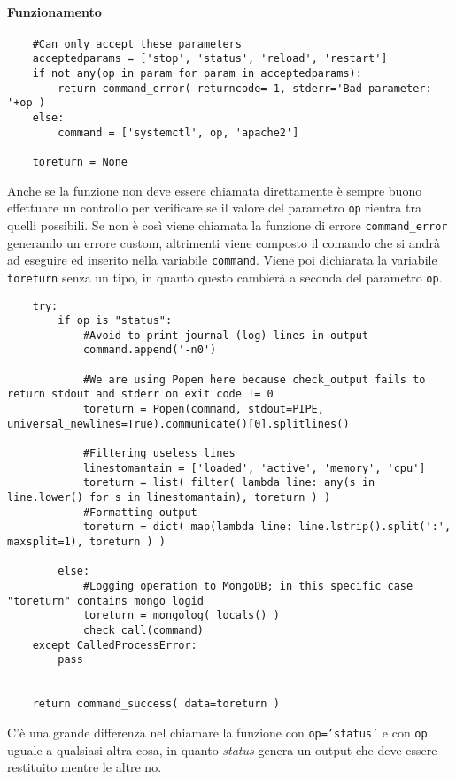 \documentclass[11pt]{article}
\begin{document}
\paragraph{Funzionamento}
\begin{lstlisting}
    #Can only accept these parameters
    acceptedparams = ['stop', 'status', 'reload', 'restart']
    if not any(op in param for param in acceptedparams):
        return command_error( returncode=-1, stderr='Bad parameter: '+op )
    else:
        command = ['systemctl', op, 'apache2']

    toreturn = None
\end{lstlisting}
Anche se la funzione non deve essere chiamata direttamente è sempre buono effettuare un controllo per verificare se il valore
del parametro \texttt{op} rientra tra quelli possibili. Se non è così viene chiamata la funzione di errore \texttt{command\_error}
generando un errore custom, altrimenti viene composto il comando che si andrà ad eseguire ed inserito nella variabile \texttt{command}.
Viene poi dichiarata la variabile \texttt{toreturn} senza un tipo, in quanto questo cambierà a seconda del parametro \texttt{op}.
\begin{lstlisting}
    try:
        if op is "status":
            #Avoid to print journal (log) lines in output
            command.append('-n0')

            #We are using Popen here because check_output fails to return stdout and stderr on exit code != 0
            toreturn = Popen(command, stdout=PIPE, universal_newlines=True).communicate()[0].splitlines()

            #Filtering useless lines
            linestomantain = ['loaded', 'active', 'memory', 'cpu']
            toreturn = list( filter( lambda line: any(s in line.lower() for s in linestomantain), toreturn ) )
            #Formatting output
            toreturn = dict( map(lambda line: line.lstrip().split(':', maxsplit=1), toreturn ) )

        else:
            #Logging operation to MongoDB; in this specific case "toreturn" contains mongo logid
            toreturn = mongolog( locals() )
            check_call(command)
    except CalledProcessError:
        pass


    return command_success( data=toreturn )
\end{lstlisting}
C'è una grande differenza nel chiamare la funzione con \texttt{op='status'} e con \texttt{op} uguale a qualsiasi altra cosa,
in quanto \textit{status} genera un output che deve essere restituito mentre le altre no.\\
\end{document}
